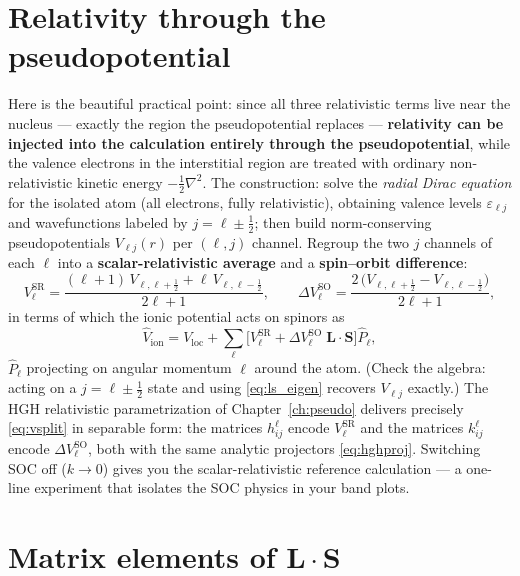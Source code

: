 \section{Relativity through the pseudopotential}

Here is the beautiful practical point: since all three relativistic terms
live near the nucleus --- exactly the region the pseudopotential replaces ---
\textbf{relativity can be injected into the calculation entirely through the
pseudopotential}, while the valence electrons in the interstitial region are
treated with ordinary non-relativistic kinetic energy $-\tfrac12\nabla^2$.
The construction: solve the \emph{radial Dirac equation} for the isolated
atom (all electrons, fully relativistic), obtaining valence levels
$\varepsilon_{\ell j}$ and wavefunctions labeled by $j = \ell \pm \tfrac12$;
then build norm-conserving pseudopotentials $V_{\ell j}(r)$ per $(\ell, j)$
channel. Regroup the two $j$ channels of each $\ell$ into a
\textbf{scalar-relativistic average} and a \textbf{spin--orbit difference}:
\begin{equation}
V^{\mathrm{SR}}_{\ell}
= \frac{(\ell{+}1)\, V_{\ell, \ell+\frac12} + \ell\, V_{\ell, \ell-\frac12}}
{2\ell + 1},
\qquad
\Delta V^{\mathrm{SO}}_{\ell}
= \frac{2\,\big(V_{\ell,\ell+\frac12} - V_{\ell,\ell-\frac12}\big)}{2\ell+1},
\end{equation}
in terms of which the ionic potential acts on spinors as
\begin{equation}
\hat V_{\mathrm{ion}} = V_{\mathrm{loc}} + \sum_{\ell}
\Big[V^{\mathrm{SR}}_{\ell}
+ \Delta V^{\mathrm{SO}}_{\ell}\; \mathbf L \cdot \mathbf S\Big]
\hat P_{\ell},
\label{eq:vsplit}
\end{equation}
$\hat P_\ell$ projecting on angular momentum $\ell$ around the atom. (Check
the algebra: acting on a $j = \ell\pm\tfrac12$ state and using
\eqref{eq:ls_eigen} recovers $V_{\ell j}$ exactly.) The HGH relativistic
parametrization of Chapter~\ref{ch:pseudo} delivers precisely
\eqref{eq:vsplit} in separable form: the matrices $h^{\ell}_{ij}$ encode
$V^{\mathrm{SR}}_\ell$ and the matrices $k^{\ell}_{ij}$ encode
$\Delta V^{\mathrm{SO}}_\ell$, both with the same analytic projectors
\eqref{eq:hghproj}. Switching SOC off ($k \to 0$) gives you the
scalar-relativistic reference calculation --- a one-line experiment that
isolates the SOC physics in your band plots.

\section{Matrix elements of \texorpdfstring{$\mathbf{L}\cdot\mathbf{S}$}{L·S}}
\label{sec:lsmatrix}

